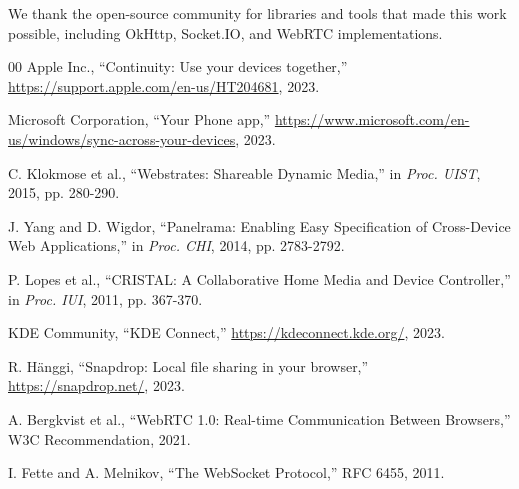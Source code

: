 \documentclass[conference]{IEEEtran}
\begin{document}
We thank the open-source community for libraries and tools that made this work possible, including OkHttp, Socket.IO, and WebRTC implementations.

\begin{thebibliography}{00}
 Apple Inc., ``Continuity: Use your devices together,'' \url{https://support.apple.com/en-us/HT204681}, 2023.

 Microsoft Corporation, ``Your Phone app,'' \url{https://www.microsoft.com/en-us/windows/sync-across-your-devices}, 2023.

 C. Klokmose et al., ``Webstrates: Shareable Dynamic Media,'' in \textit{Proc. UIST}, 2015, pp. 280-290.

 J. Yang and D. Wigdor, ``Panelrama: Enabling Easy Specification of Cross-Device Web Applications,'' in \textit{Proc. CHI}, 2014, pp. 2783-2792.

 P. Lopes et al., ``CRISTAL: A Collaborative Home Media and Device Controller,'' in \textit{Proc. IUI}, 2011, pp. 367-370.

 KDE Community, ``KDE Connect,'' \url{https://kdeconnect.kde.org/}, 2023.

 R. Hänggi, ``Snapdrop: Local file sharing in your browser,'' \url{https://snapdrop.net/}, 2023.

 A. Bergkvist et al., ``WebRTC 1.0: Real-time Communication Between Browsers,'' W3C Recommendation, 2021.

 I. Fette and A. Melnikov, ``The WebSocket Protocol,'' RFC 6455, 2011.
\end{thebibliography}
\end{document}
